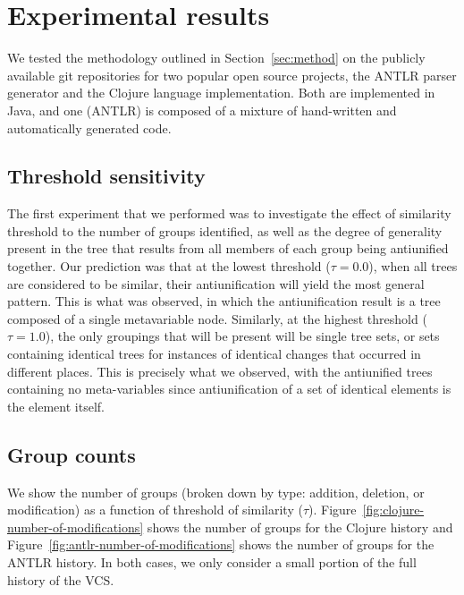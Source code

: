 \section{Experimental results}

We tested the methodology outlined in Section~\ref{sec:method} on the
publicly available git repositories for two popular open source
projects, the ANTLR parser generator and the Clojure language implementation.
Both are implemented in Java, and one (ANTLR) is composed of a mixture of
hand-written and automatically generated code.  

\subsection{Threshold sensitivity}
\label{sec:threshold}

The first experiment that we performed was to investigate the effect of
similarity threshold to the number of groups identified, as well as the degree
of generality present in the tree that results from all members of each group
being antiunified together. Our prediction was that at the lowest threshold
($\tau = 0.0$), when all trees are considered to be similar, their antiunification will
yield the most general pattern.  This is what was observed, in which the
antiunification result is a tree composed of a single metavariable node.
Similarly, at the highest threshold ($\tau = 1.0$), the only groupings that will be
present will be single tree sets, or sets containing identical trees for
instances of identical changes that occurred in different places.  This is
precisely what we observed, with the antiunified trees containing no 
meta-variables since antiunification of a set of identical elements is the 
element itself.

\subsection{Group counts}
\label{sec:groups}
  
We show the number of groups (broken down by type: addition, deletion, or
modification) as a function of threshold of similarity ($\tau$).
Figure~\ref{fig:clojure-number-of-modifications} shows the number of groups
for the Clojure history and Figure~\ref{fig:antlr-number-of-modifications}
shows the number of groups for the ANTLR history. In both cases, we only
consider a small portion of the full history of the VCS.

